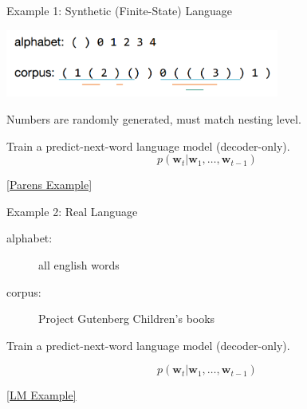 \documentclass{beamer}
\let\tempone\itemize
\let\temptwo\enditemize
\renewenvironment{itemize}{\tempone\addtolength{\itemsep}{0.5\baselineskip}}{\temptwo}
\newcommand{\air}{\vspace{0.25cm}}
\newcommand{\mair}{\vspace{-0.25cm}}
\newcommand{\wvec}{\mathbf{w}}
\begin{document}
\begin{frame}
  \centerline{\alert{Example 1}: Synthetic (Finite-State) Language}
  \air

  \begin{center}
    \includegraphics[width=9cm]{parenlang}
  \end{center}
  \mair

  \begin{itemize}
  \item Numbers are randomly generated, must match nesting level.
    \air

  \item Train a predict-next-word language model (decoder-only).
  \end{itemize}
    \[ p(\wvec_t | \wvec_1, \ldots, \wvec_{t-1}) \] 
  
\air
  \centerline{\href{http://lstm.seas.harvard.edu/client/pattern_finder.html?data_set=00parens&source=states::states2&pos=150}{[Parens Example]}}
\end{frame}


\begin{frame}
  \centerline{\alert{Example 2}: Real Language}
  \air

  \begin{description}
  \item[alphabet:] all english words
  \item[corpus:] Project Gutenberg Children's books 
  \end{description}

  \begin{itemize}

  \item Train a predict-next-word language model (decoder-only).

  
  \end{itemize}
    \[ p(\wvec_t | \wvec_1, \ldots, \wvec_{t-1}) \] 

\air
  \centerline{ \href{http://lstm.seas.harvard.edu/client/pattern_finder.html?data_set=05childbook&source=states::states1&pos=100}{[LM Example]}}
\end{frame}
\end{document}
